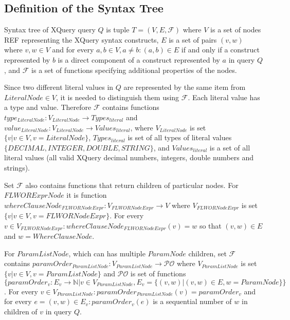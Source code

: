 \subsection{Definition of the Syntax Tree}
\begin{definition}
Syntax tree of XQuery query $Q$ is tuple $T = (V, E, \mathcal{F})$ where $V$ is a set of nodes REF representing the XQuery syntax constructs, $E$ is a set of pairs $(v, w)$ where $v,w \in V$ and for every $a, b \in V, a \neq b: (a, b) \in E$ if and only if a construct represented by $b$ is a direct component of a construct represented by $a$ in query $Q$, and $\mathcal{F}$ is a set of functions specifying additional properties of the nodes.

Since two different literal values in $Q$ are represented by the same item from $LiteralNode \in V$, it is needed to distinguish them using $\mathcal{F}$. Each literal value has a type and value. Therefore $\mathcal{F}$ contains functions $type_{LiteralNode}: V_{LiteralNode} \rightarrow Types_{literal}$ and $value_{LiteralNode}: V_{LiteralNode} \rightarrow Values_{literal}$, where $V_{LiteralNode}$ is set $\{v | v \in V, v = LiteralNode\}$, $Types_{literal}$ is set of all types of literal values $\{DECIMAL, INTEGER, DOUBLE, STRING\}$, and $Values_{literal}$ is a set of all literal values (all valid XQuery decimal numbers, integers, double numbers and strings).

Set $\mathcal{F}$ also contains functions that return children of particular nodes. For $FLWORExprNode$ it is function $whereClauseNode_{FLWORNodeExpr} : V_{FLWORNodeExpr} \rightarrow V$ where $V_{FLWORNodeExpr}$ is set $\{v | v \in V, v = FLWORNodeExpr\}$. For every $v \in V_{FLWORNodeExpr}: whereClauseNode_{FLWORNodeExpr}(v) = w$ so that $(v, w) \in E$ and $w = WhereClauseNode$.

For $ParamListNode$, which can has multiple $ParamNode$ children, set $\mathcal{F}$ contains $paramOrder_{ParamListNode} : V_{ParamListNode} \rightarrow \mathcal{PO}$ where $V_{ParamListNode}$ is set $\{v | v \in V, v = ParamListNode\}$ and $\mathcal{PO}$ is set of functions $\{paramOrder_v : E_v \rightarrow \mathbb{N} | v \in V_{ParamListNode}, E_v = \{(v,w) | (v,w) \in E, w = ParamNode\}\}$. For every $v \in V_{ParamListNode}: paramOrder_{ParamListNode}(v) = paramOrder_v$ and for every $e = (v, w) \in E_v: paramOrder_v(e)$ is a sequential number of $w$ in children of $v$ in query $Q$. 
\end{definition}

